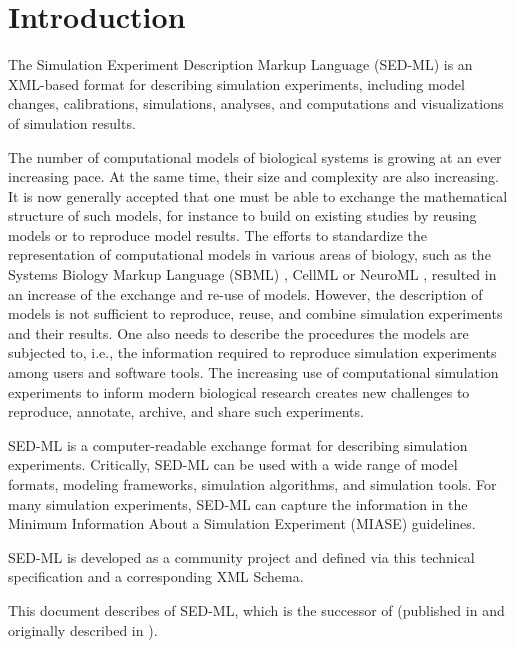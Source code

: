 \chapter{Introduction}
The Simulation Experiment Description Markup Language (SED-ML) is an XML-based format for describing simulation experiments, including model changes, calibrations, simulations, analyses, and computations and visualizations of simulation results.

The number of computational models of biological systems is growing at an ever increasing pace.
At the same time, their size and complexity are also increasing. It is now generally accepted that one must be able to exchange the mathematical structure of such models, for instance to build on existing studies by reusing models or to reproduce model results. The efforts to standardize the representation of computational models in various areas of biology, such as the Systems Biology Markup Language (SBML) \citep{Hucka:2003}, CellML \citep{cuellar:2003} or NeuroML \citep{Goddard:2001}, resulted in an increase of the exchange and re-use of models. However, the description of models is not sufficient to reproduce, reuse, and combine simulation experiments and their results. One also needs to describe the procedures the models are subjected to, i.e., the information required to reproduce simulation experiments among users and software tools. The increasing use of computational simulation experiments to inform modern biological research creates new challenges to reproduce, annotate, archive, and share such experiments.

SED-ML is a computer-readable exchange format for describing simulation experiments. Critically, SED-ML can be used with a wide range of model formats, modeling frameworks, simulation algorithms, and simulation tools. For many simulation experiments, SED-ML can capture the information in the Minimum Information About a Simulation Experiment (MIASE) \citep{Waltemath:2011} guidelines.

SED-ML is developed as a community project and defined via this technical specification and a corresponding XML Schema. 

This document describes \currentLV of SED-ML, which is the successor of \previousLV (published in \citep{smith2021sedl1v4} and originally described in \citep{WAB+11}).

